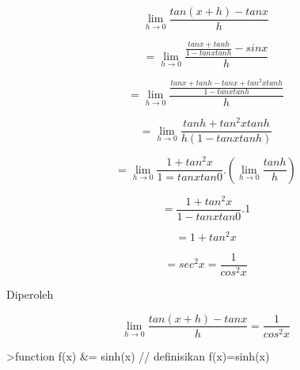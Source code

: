 \documentclass{article}
\begin{document}
\begin{eulernotebook}
\begin{eulercomment}
\begin{eulercomment}
\begin{eulercomment}
\end{eulercomment}
\begin{eulercomment}
\end{eulercomment}
\begin{eulerformula}
\[
\lim_{h\to 0} \frac{tan(x+h)-tanx}{h}
\]
\end{eulerformula}
\begin{eulercomment}
\end{eulercomment}
\begin{eulerformula}
\[
= \lim_{h\to 0} \frac{ \frac{tanx+tanh}{1-tanxtanh}-sinx}{h}
\]
\end{eulerformula}
\begin{eulercomment}
\end{eulercomment}
\begin{eulerformula}
\[
= \lim_{h\to 0} \frac{\frac{tanx+tanh-tanx+tan^2xtanh}{1-tanxtanh}}{h}
\]
\end{eulerformula}
\begin{eulercomment}
\end{eulercomment}
\begin{eulerformula}
\[
= \lim_{h\to 0} \frac{tanh+tan^2xtanh}{h(1-tanxtanh)}
\]
\end{eulerformula}
\begin{eulercomment}
\end{eulercomment}
\begin{eulerformula}
\[
= \lim_{h\to 0} \frac{1+tan^2x}{1=tanxtan0} . (\lim_{h\to 0}\frac{tanh}{h})
\]
\end{eulerformula}
\begin{eulercomment}
\end{eulercomment}
\begin{eulerformula}
\[
= \frac{1+tan^2x}{1-tanxtan0} . 1
\]
\end{eulerformula}
\begin{eulercomment}
\end{eulercomment}
\begin{eulerformula}
\[
= 1+tan^2x
\]
\end{eulerformula}
\begin{eulercomment}
\end{eulercomment}
\begin{eulerformula}
\[
= sec^2x = \frac{1}{cos^2x}
\]
\end{eulerformula}
\begin{eulercomment}
Diperoleh

\end{eulercomment}
\begin{eulerformula}
\[
\lim_{h\to 0} \frac{tan(x+h)-tanx}{h} = \frac {1}{cos^2x}
\]
\end{eulerformula}
\begin{eulercomment}
\end{eulercomment}
\eulersubheading{}
\begin{eulerprompt}
>function f(x) &= sinh(x) // definisikan f(x)=sinh(x)
\end{eulerprompt}
\begin{euleroutput}
  

\end{euleroutput}
\end{eulercomment}
\end{eulercomment}
\end{eulernotebook}
\end{document}
